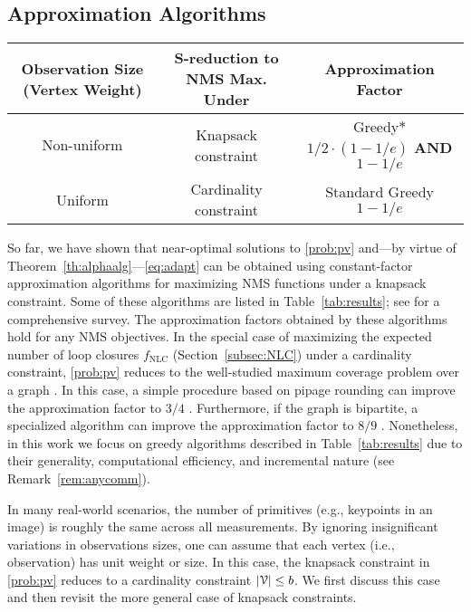 \documentclass[conference]{IEEEtran}
\begin{document}
\subsection{Approximation Algorithms}
\label{subsec:apxalg}
\begin{table*}
  \begin{center}
	\caption{A summary of approximation algorithms for maximizing NMS functions
	  based on \cite{krauseSurvey}} \label{tab:results}
	\def\arraystretch{1.2}
	\begin{tabular}{ccc}
	  \hline
	  \textbf{\small Observation Size (Vertex Weight)}& \textbf{\footnotesize S-reduction to NMS Max. Under} & \textbf{\small Approximation Factor}\\
	  \hline
	  \hline
	  \small Non-uniform
	  & \small Knapsack constraint &
	  \small Greedy$\ast$ \cite{leskovec2007cost} $1/2 \cdot (1-1/e)$ \textbf{AND} $1-1/e$ \cite{sviridenko2004note} \\
	  \hline
	  \small Uniform &
	  \small Cardinality constraint & \small Standard Greedy $1-1/e$ \cite{nemhauser1978analysis}\\
	  \hline
	\end{tabular}
  \end{center}
\end{table*}
So far, we have shown that near-optimal solutions to
\ref{prob:pv} and---by virtue of Theorem~\ref{th:alphaalg}---\ref{eq:adapt}
can be obtained 
using constant-factor approximation algorithms for maximizing 
NMS functions under a knapsack constraint.
Some of these algorithms are listed
in Table~\ref{tab:results}; see \cite{krauseSurvey} for a comprehensive survey.
The approximation factors obtained by these algorithms hold for any NMS objectives. 
In the special case of maximizing the expected number of loop closures $f_\text{NLC}$ 
(Section~\ref{subsec:NLC})
under a cardinality constraint, 
\ref{prob:pv} reduces to the well-studied 
maximum coverage problem over a graph \cite{hochbaum1996approximation}. 
In this case, a simple procedure based on pipage rounding can improve the approximation factor to $3/4$ \cite{ageevGraphMaxCover}. Furthermore,
if the graph is bipartite, a specialized algorithm can improve the approximation factor to $8/9$ \cite{caskurluBipartiteMaxCover}.
Nonetheless, in this work we focus on greedy algorithms 
described in Table~\ref{tab:results}
due to their generality,
computational efficiency, and incremental nature (see Remark~\ref{rem:anycomm}). 


In many real-world scenarios, the number of
primitives (e.g., keypoints in an image) is roughly the same
across all measurements. By ignoring insignificant 
variations in observations sizes, one can assume that
each vertex (i.e., observation) has unit weight or size. In this case, the knapsack constraint
in \ref{prob:pv} reduces to a cardinality constraint $|\mathcal{V}|\leq b$.
We first discuss this case and then revisit the more general case of
knapsack constraints.\vspace{0.4cm}
\end{document}
